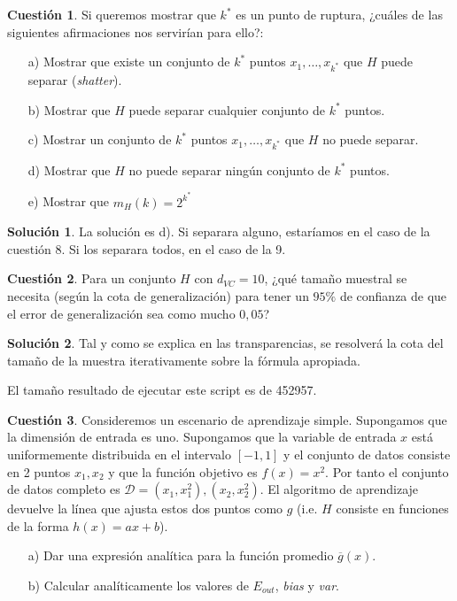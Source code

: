 \documentclass[a4paper, 11pt]{article}
\theoremstyle{definition}
\newtheorem{cuestion}{Cuestión}
\newtheorem*{solucion}{Solución}
\begin{document}
  \begin{cuestion}
  Si queremos mostrar que $k^*$ es un punto de ruptura, ¿cuáles de las siguientes afirmaciones nos servirían para ello?:
  \begin{enumerate}
  \item[a)] Mostrar que existe un conjunto de $k^*$ puntos $x_1,\ldots,x_{k^*}$ que $H$ puede separar (\emph{shatter}).
  \item[b)] Mostrar que $H$ puede separar cualquier conjunto de $k^*$ puntos.
  \item[c)] Mostrar un conjunto de $k^*$ puntos $x_1,\ldots,x_{k^*}$ que $H$ no puede separar.
  \item[d)] Mostrar que $H$ no puede separar ningún conjunto de $k^*$ puntos.
  \item[e)] Mostrar que $m_H(k)=2^{k^*}$
  \end{enumerate}
  \end{cuestion}

  \begin{solucion}
    La solución es d). Si separara alguno, estaríamos en el caso de la cuestión 8. Si los separara todos, en el caso de la 9.
  \end{solucion}

  \begin{cuestion}
  Para un conjunto $H$ con $d_{VC}=10$, ¿qué tamaño muestral se necesita (según la cota de generalización) para tener un $95\%$ de confianza de que el error de generalización sea como mucho $0,05$?

  \end{cuestion}

  \begin{solucion}
    Tal y como se explica en las transparencias, se resolverá la cota del tamaño de la muestra iterativamente sobre la fórmula apropiada.

    

    El tamaño resultado de ejecutar este script es de 452957.
  \end{solucion}

  \begin{cuestion}
  Consideremos un escenario de aprendizaje simple. Supongamos que la dimensión de entrada es uno. Supongamos que la variable de entrada $x$ está uniformemente distribuida en el intervalo $[-1,1]$ y el conjunto de datos consiste en 2 puntos ${x_1,x_2}$ y que la función objetivo es $f(x)=x^2$. Por tanto el conjunto de datos completo es $\mathcal{D}={(x_1,x_1^2), (x_2,x_2^2)}$. El algoritmo de aprendizaje devuelve la línea que ajusta estos dos puntos como $g$ (i.e. $H$ consiste en funciones de la forma $h(x)=ax+b$).
  \begin{enumerate}
  \item[a)] Dar una expresión analítica para la función promedio $\overline{g}(x)$.
  \item[b)] Calcular analíticamente los valores de $E_{out}$, \emph{bias} y \emph{var}.
  \end{enumerate}

  \end{cuestion}
\end{document}
